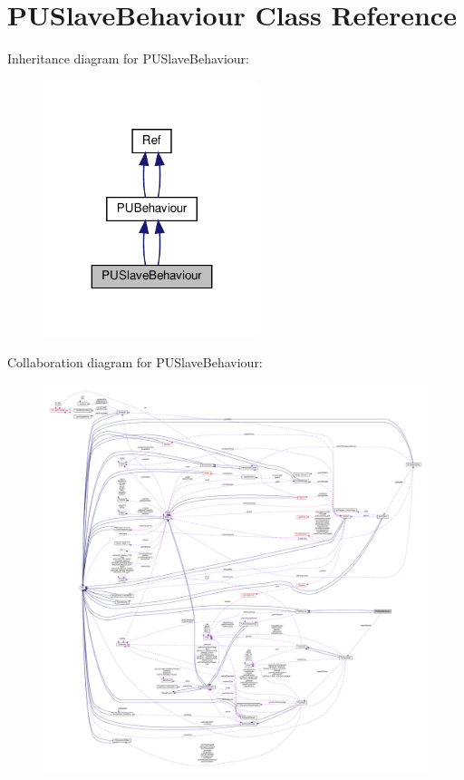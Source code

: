 \hypertarget{classPUSlaveBehaviour}{}\section{P\+U\+Slave\+Behaviour Class Reference}
\label{classPUSlaveBehaviour}


Inheritance diagram for P\+U\+Slave\+Behaviour\+:
\nopagebreak
\begin{figure}[H]
\begin{center}
\leavevmode
\includegraphics[width=179pt]{classPUSlaveBehaviour__inherit__graph}
\end{center}
\end{figure}


Collaboration diagram for P\+U\+Slave\+Behaviour\+:
\nopagebreak
\begin{figure}[H]
\begin{center}
\leavevmode
\includegraphics[width=350pt]{classPUSlaveBehaviour__coll__graph}
\end{center}
\end{figure}
